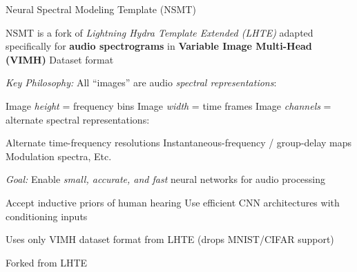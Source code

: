 \begin{slide}[\slideopts,toc={NSMT Overview}]{Neural Spectral Modeling Template (NSMT)}

  \vspace{-1em}

  \begin{itemize}

    \mpitem NSMT is a fork of \emph{Lightning Hydra Template Extended (LHTE)} adapted specifically for
    \textbf{audio spectrograms} in \textbf{Variable Image Multi-Head (VIMH)} Dataset format

    \mpitem \emph{Key Philosophy:} All ``images'' are audio \emph{spectral representations}:
    \vspace{-0.5em}
    \begin{itemize}
      \mpitem Image \emph{height} = frequency bins
      \mpitem Image \emph{width} = time frames
      \mpitem Image \emph{channels} = alternate spectral representations:
      \begin{itemize}
        \mpitem Alternate time-frequency resolutions
        \mpitem Instantaneous-frequency / group-delay maps
        \mpitem Modulation spectra, Etc.
      \end{itemize}
    \end{itemize}

    \vspace{-0.5em}
    \mpitem \emph{Goal:} Enable \emph{small, accurate, and fast} neural networks for audio processing
    \vspace{-0.5em}
    \begin{itemize}
      \mpitem Accept inductive priors of human hearing
      \mpitem Use efficient CNN architectures with conditioning inputs
    \end{itemize}

    \vspace{-0.5em}
    \mpitem Uses only VIMH dataset format from LHTE (drops MNIST/CIFAR support)

    \mpitem Forked from LHTE %

  \end{itemize}

\end{slide}

